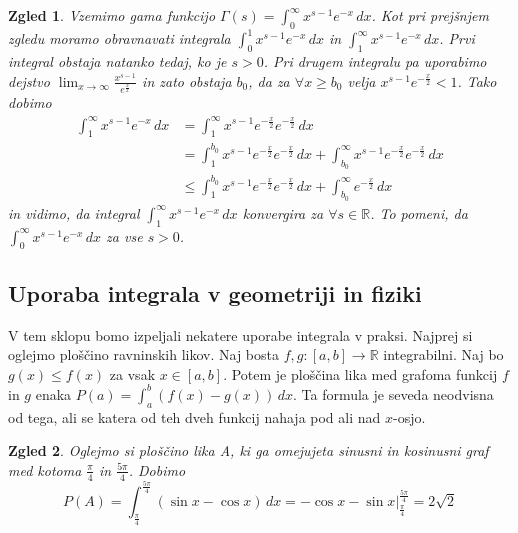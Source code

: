 \documentclass[10pt, a4paper]{article}
\newtheorem{zgled}{Zgled}[section]
\newcommand{\R}{\mathbb {R}}
\newcommand{\limf}[3]{\lim_{#1 \to #2} {#3}}
\begin{document}
\begin{zgled}
    Vzemimo gama funkcijo $\Gamma(s) = \int_0 ^\infty x^{s-1} e^{-x}\,dx$.
    Kot pri prejšnjem zgledu moramo obravnavati integrala $\int_0 ^1 x^{s-1} e^{-x}\,dx$ in $\int_1 ^\infty x^{s-1} e^{-x}\,dx$.
    Prvi integral obstaja natanko tedaj, ko je $s > 0$.
    Pri drugem integralu pa uporabimo dejstvo $\limf{x}{\infty}{\frac{x^{s-1}}{e^{\frac{x}{2}}}}$ in zato obstaja $b_0$, da za $\forall x \geq b_0$ velja $x^{s-1} e^{-\frac{x}{2}} < 1$.
    Tako dobimo
    \begin{align*}
        \int_1 ^\infty x^{s-1} e^{-x}\,dx &= \int_1 ^\infty x^{s-1} e^{-\frac{x}{2}} e^{-\frac{x}{2}}\,dx\\
        &= \int_1 ^{b_0} x^{s-1} e^{-\frac{x}{2}} e^{-\frac{x}{2}}\,dx
        + \int_{b_0} ^\infty x^{s-1} e^{-\frac{x}{2}} e^{-\frac{x}{2}}\,dx\\
        &\leq \int_1 ^{b_0} x^{s-1} e^{-\frac{x}{2}} e^{-\frac{x}{2}}\,dx
        + \int_{b_0} ^\infty e^{-\frac{x}{2}}\,dx
    \end{align*} 
    in vidimo, da integral $\int_1 ^\infty x^{s-1} e^{-x}\,dx$ konvergira za $\forall s \in \R$.
    To pomeni, da $\int_0 ^\infty x^{s-1} e^{-x}\,dx$ za vse $s > 0$.
\end{zgled}

\subsection{Uporaba integrala v geometriji in fiziki}

V tem sklopu bomo izpeljali nekatere uporabe integrala v praksi.
Najprej si oglejmo ploščino ravninskih likov. 
Naj bosta $f, g: [a, b] \rightarrow \R$ integrabilni.
Naj bo $g(x) \leq f(x)$ za vsak $x \in [a, b]$.
Potem je ploščina lika med grafoma funkcij $f$ in $g$ enaka $P(a) = \int_a ^b (f(x) - g(x))\,dx$.
Ta formula je seveda neodvisna od tega, ali se katera od teh dveh funkcij nahaja pod ali nad $x$-osjo.

\begin{zgled}
    \label{zgl:10}
    Oglejmo si ploščino lika A, ki ga omejujeta sinusni in kosinusni graf med kotoma $\frac{\pi}{4}$ in $\frac{5 \pi}{4}$.
    Dobimo $$P(A) = \int_{\frac{\pi}{4}} ^{\frac{5 \pi}{4}} (\sin x - \cos x)\,dx = - \cos x - \sin x \Big|_{\frac{\pi}{4}} ^{\frac{5 \pi}{4}} = 2 \sqrt{2}$$
\end{zgled}
\end{document}
